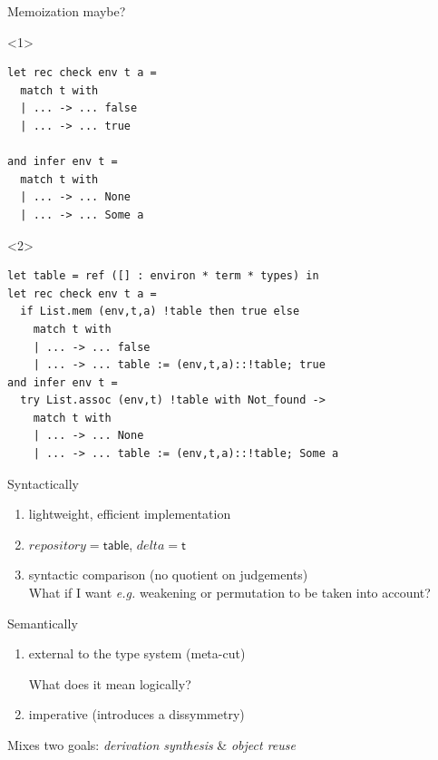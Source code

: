 \documentclass[ignorenonframetext,red]{beamer}
\begin{document}
\begin{frame}[fragile]{Memoization maybe?}
  \begin{onlyenv}<1>
    \vspace{4em}
\begin{lstlisting}
let rec check env t a = 
  match t with
  | ... -> ... false
  | ... -> ... true

and infer env t =
  match t with 
  | ... -> ... None
  | ... -> ... Some a
\end{lstlisting}
  \end{onlyenv}
  \begin{onlyenv}<2>
    \vspace{3em}
\begin{lstlisting}
let table = ref ([] : environ * term * types) in
let rec check env t a = 
  if List.mem (env,t,a) !table then true else
    match t with
    | ... -> ... false
    | ... -> ... table := (env,t,a)::!table; true
and infer env t =
  try List.assoc (env,t) !table with Not_found ->
    match t with 
    | ... -> ... None
    | ... -> ... table := (env,t,a)::!table; Some a
\end{lstlisting}
  \end{onlyenv}
  \pause\pause
  \begin{block}{Syntactically}
    \begin{enumerate}
    \item[\itplus] lightweight, efficient implementation
      \pause
    \item[\itplus] $repository = \mathsf{table}$, $delta =
      \mathsf{t}$
      \pause
    \item [\itminus] syntactic comparison (no quotient on judgements) \\
    {\footnotesize What if I want \emph{e.g.} weakening or
      permutation to be taken into account?}
    \end{enumerate}
  \end{block}
  \pause
  \vspace{-1em}
  \begin{block}{Semantically}
    \begin{enumerate}
    \item[\itminus] external to the type system (meta-cut) \\
      {\footnotesize What does it mean logically?
      }
      \pause
    \item[\itminus] imperative (introduces a dissymmetry)
    \end{enumerate}
  \end{block}
  \pause
  {\footnotesize Mixes two goals:} {\large \it derivation synthesis}
  {\footnotesize \&} {\large \it object reuse}
\end{frame}
\end{document}
